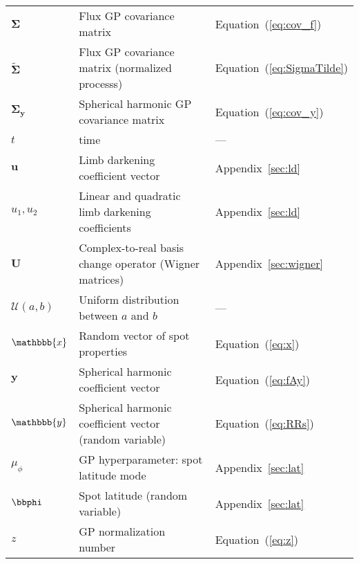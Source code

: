 \begin{center}
\begin{longtable}{W{c}{1cm} W{l}{9cm} W{l}{2cm}}
        $\pmb{\Sigma}$
         & Flux GP covariance matrix
         & Equation~(\ref{eq:cov_f})
        \\
        $\tilde{\pmb{\Sigma}}$
         & Flux GP covariance matrix (normalized processs)
         & Equation~(\ref{eq:SigmaTilde})
        \\
        $\pmb{\Sigma}_\mathbf{y}$
         & Spherical harmonic GP covariance matrix
         & Equation~(\ref{eq:cov_y})
        \\
        $t$
         & time
         & ---
        \\
        $\mathbf{u}$
         & Limb darkening coefficient vector
         & Appendix~\ref{sec:ld}
        \\
        $u_1, u_2$
         & Linear and quadratic limb darkening coefficients
         & Appendix~\ref{sec:ld}
        \\
        $\mathbf{U}$
         & Complex-to-real basis change operator (Wigner matrices)
         & Appendix~\ref{sec:wigner}
        \\
        $\mathcal{U}(a, b)$
         & Uniform distribution between $a$ and $b$
         & ---
        \\
        $\mathbbb{x}$
         & Random vector of spot properties
         & Equation~(\ref{eq:x})
        \\
        $\mathbf{y}$
         & Spherical harmonic coefficient vector
         & Equation~(\ref{eq:fAy})
        \\
        $\mathbbb{y}$
         & Spherical harmonic coefficient vector (random variable)
         & Equation~(\ref{eq:RRs})
        \\
        $\mu_\phi$
         & GP hyperparameter: spot latitude mode
         & Appendix~\ref{sec:lat}
        \\
        $\bbphi$
         & Spot latitude (random variable)
         & Appendix~\ref{sec:lat}
        \\
        $z$
         & GP normalization number
         & Equation~(\ref{eq:z})
        \\
    \end{longtable}
\end{center}